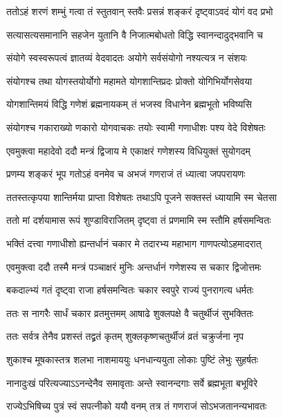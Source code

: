 \twolineshloka
{ततोऽहं शरणं शम्भुं गत्वा तं स्तुतवान् स्तवैः}
{प्रसन्नं शङ्करं दृष्ट्वाऽवदं योगं वद प्रभो} %


\twolineshloka
{सत्यासत्यसमानानि सहजेन युतानि वै}
{निजात्मबोधतो विद्धि स्वानन्दादुद्भवानि च} %

\twolineshloka
{संयोगे स्वस्वरूपत्वं ज्ञातव्यं वेदवादतः}
{अयोगे सर्वसंयोगो नश्यत्यत्र न संशयः} %

\twolineshloka
{संयोगश्च तथा योगस्तयोर्योगो महामते}
{योगशान्तिप्रदः प्रोक्तो योगिभिर्योगसेवया} %

\twolineshloka
{योगशान्तिमयं विद्धि गणेशं ब्रह्मनायकम्}
{तं भजस्व विधानेन ब्रह्मभूतो भविष्यसि} %

\twolineshloka
{संयोगश्च गकाराख्यो णकारो योगवाचकः}
{तयोः स्वामी गणाधीशः पश्य वेदे विशेषतः} %

\twolineshloka
{एवमुक्त्वा महादेवो ददौ मन्त्रं द्विजाय मे}
{एकाक्षरं गणेशस्य विधियुक्तं सुयोगदम्} %

\twolineshloka
{प्रणम्य शङ्करं भूप गतोऽहं वनमेव च}
{अभजं गणराजं तं ध्यात्वा जपपरायणः} %

\twolineshloka
{ततस्तत्कृपया शान्तिर्मया प्राप्ता विशेषतः}
{तथाऽपि पूजने सक्तस्तं ध्यायामि स्म चेतसा} %

\twolineshloka
{ततो मां दर्शयामास रूपं शुण्डाविराजितम्}
{दृष्ट्वा तं प्रणमामि स्म स्तौमि हर्षसमन्वितः} %

\twolineshloka
{भक्तिं दत्त्वा गणाधीशो ह्यन्तर्धानं चकार मे}
{तदारभ्य महाभाग गाणपत्योऽहमादरात्} %

\twolineshloka
{एवमुक्त्वा ददौ तस्मै मन्त्रं पञ्चाक्षरं मुनिः}
{अन्तर्धानं गणेशस्य स चकार द्विजोत्तमः} %

\twolineshloka
{बकदाल्भ्यं गतं दृष्ट्वा राजा हर्षसमन्वितः}
{चकार स्वपुरे राज्यं पुनरागत्य धर्मतः} %

\twolineshloka
{ततः स नागरैः सार्धं चकार व्रतमुत्तमम्}
{आषाढे शुक्लपक्षे वै चतुर्थीजं सुभक्तितः} %

\twolineshloka
{ततः सर्वत्र तेनैव प्रशस्तं तद्व्रतं कृतम्}
{शुक्लकृष्णचतुर्थीजं व्रतं चक्रुर्जना नृप} %

\twolineshloka
{शुकाश्च मूषकास्तत्र शलभा नाशमाययुः}
{धनधान्ययुता लोकाः पुष्टिं लेभुः सुहर्षतः} %

\twolineshloka
{नानादुःखं परित्यज्याऽऽनन्देनैव समावृताः}
{अन्ते स्वानन्दगाः सर्वे ब्रह्मभूता बभूविरे} %

\twolineshloka
{राज्येऽभिषिच्य पुत्रं स्वं सपत्नीको ययौ वनम्}
{तत्र तं गणराजं सोऽभजतानन्यभावतः} %


